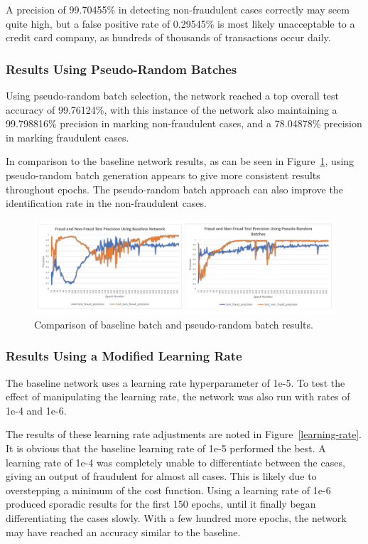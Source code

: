 \documentclass{article}
\begin{document}
 A precision of 99.70455\% in detecting non-fraudulent cases correctly may seem quite high,
 but a false positive rate of 0.29545\% is most likely unacceptable to a credit card company,
 as hundreds of thousands of transactions occur daily.


\subsubsection{Results Using Pseudo-Random Batches}

 Using pseudo-random batch selection, the network reached a top overall test accuracy of 99.76124\%,
 with this instance of the network also maintaining a 99.798816\% precision in marking non-fraudulent 
 cases, and a 78.04878\% precision in marking fraudulent cases. 

 In comparison to the baseline network results, as can be seen in Figure~\ref{basline-random},  
 using pseudo-random batch generation appears to give more consistent results throughout epochs.
 The pseudo-random batch approach can also improve the identification rate in the non-fraudulent cases.

\begin{figure}
  \begin{center}
    \includegraphics[width=135mm]{FraudNonFraudTestPrecision.pdf}
    \caption{Comparison of baseline batch and pseudo-random batch results.}
    \label{basline-random}
  \end{center}
\end{figure}

\subsubsection{Results Using a Modified Learning Rate}

 The baseline network uses a learning rate hyperparameter of 1e-5. To test the effect of
 manipulating the learning rate, the network was also run with rates of 1e-4 and 1e-6.

The results of these learning rate adjustments are noted in Figure~\ref{learning-rate}.
 It is obvious that the baseline learning rate of 1e-5 performed the best. A learning rate
 of 1e-4 was completely unable to differentiate between the cases, giving an output of
 fraudulent for almost all cases. This is likely due to overstepping a minimum of the cost
 function. Using a learning rate of 1e-6 produced sporadic results for the first 150 epochs,
 until it finally began differentiating the cases slowly. With a few hundred more epochs, the
 network may have reached an accuracy similar to the baseline.
\end{document}
